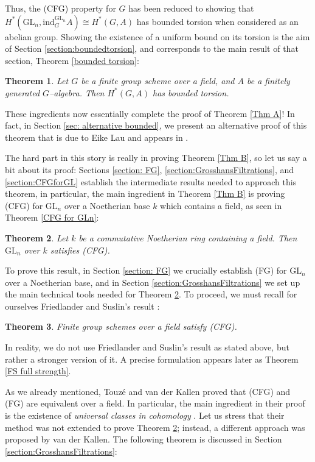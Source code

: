 \documentclass{article}
\theoremstyle{plain}
\newtheorem{thmx}{Theorem}
\theoremstyle{definition}
\newcommand{\GL}{\mathrm{GL}}
\begin{document}
Thus, the (CFG) property for $G$ has been reduced to showing that $H^\ast(\GL_n,\mathrm{ind}_G^{\GL_n}A)\cong H^\ast(G,A)$ has bounded torsion when considered as an abelian group. Showing the existence of a uniform bound on its torsion is the aim of Section \ref{section:boundedtorsion}, and corresponds to the main result of that section, Theorem \ref{bounded torsion}:


\begin{thmx}\label{Thm C}
    Let $G$ be a finite group scheme over a field, and $A$ be a finitely generated $G$--algebra. Then $H^\ast(G,A)$ has bounded torsion. 
\end{thmx}

These ingredients now essentially complete the proof of Theorem \ref{Thm A}! In fact, in Section \ref{sec: alternative bounded}, we present an alternative proof of this theorem that is due to Eike Lau and appears in \cite{Lau2023}. 

The hard part in this story is really in proving Theorem \ref{Thm B}, so let us say a bit about its proof: Sections \ref{section: FG}, \ref{section:GrosshansFiltrations}, and \ref{section:CFGforGL} establish the intermediate results needed to approach this theorem, in particular, the main ingredient in Theorem \ref{Thm B} is proving (CFG) for $\GL_n$ over a Noetherian base $k$ which contains a field, as seen in Theorem \ref{CFG for GLn}:

\begin{thmx}\label{Thm D}
    Let $k$ be a commutative Noetherian ring containing a field. Then $\GL_n$ over $k$  satisfies (CFG).  
\end{thmx}

To prove this result, in Section \ref{section: FG} we crucially establish (FG) for $\GL_n$ over a Noetherian base, and in Section \ref{section:GrosshansFiltrations} we set up the main technical tools needed for Theorem \ref{Thm D}. To proceed, we must recall for ourselves Friedlander and Suslin's result \cite{FS97}:

\begin{thmx}\label{Thm E}
    Finite group schemes over a field satisfy (CFG). 
\end{thmx}

In reality, we do not use Friedlander and Suslin's  result as stated above, but rather a stronger version of it. A precise formulation appears later as Theorem \ref{FS full strength}. 

As we already mentioned, Touzé and van der Kallen \cite{TvdK10} proved that (CFG) and (FG) are equivalent over a field. In particular, the main ingredient in their proof is the existence of \textit{universal classes in cohomology} \cite{Tou10}. Let us stress that their method was not extended to prove Theorem \ref{Thm D}; instead, a different approach was proposed by van der Kallen. The following theorem is discussed in Section \ref{section:GrosshansFiltrations}:
\end{document}
